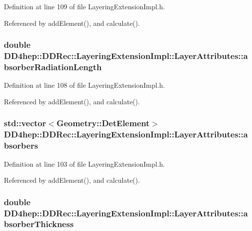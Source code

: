 Definition at line 109 of file LayeringExtensionImpl.h.

Referenced by addElement(), and calculate().\hypertarget{struct_d_d4hep_1_1_d_d_rec_1_1_layering_extension_impl_1_1_layer_attributes_ab8e487c7c57cf4ad23dc81eb85189d96}{
\subsubsection[{absorberRadiationLength}]{\setlength{\rightskip}{0pt plus 5cm}double {\bf DD4hep::DDRec::LayeringExtensionImpl::LayerAttributes::absorberRadiationLength}}}
\label{struct_d_d4hep_1_1_d_d_rec_1_1_layering_extension_impl_1_1_layer_attributes_ab8e487c7c57cf4ad23dc81eb85189d96}


Definition at line 108 of file LayeringExtensionImpl.h.

Referenced by addElement(), and calculate().\hypertarget{struct_d_d4hep_1_1_d_d_rec_1_1_layering_extension_impl_1_1_layer_attributes_a36c95a802bff564fab44f6c0cfdfbda3}{
\subsubsection[{absorbers}]{\setlength{\rightskip}{0pt plus 5cm}std::vector$<${\bf Geometry::DetElement}$>$ {\bf DD4hep::DDRec::LayeringExtensionImpl::LayerAttributes::absorbers}}}
\label{struct_d_d4hep_1_1_d_d_rec_1_1_layering_extension_impl_1_1_layer_attributes_a36c95a802bff564fab44f6c0cfdfbda3}


Definition at line 103 of file LayeringExtensionImpl.h.

Referenced by addElement(), and calculate().\hypertarget{struct_d_d4hep_1_1_d_d_rec_1_1_layering_extension_impl_1_1_layer_attributes_a82e4964fda149e1cf07f18048b13ac64}{
\subsubsection[{absorberThickness}]{\setlength{\rightskip}{0pt plus 5cm}double {\bf DD4hep::DDRec::LayeringExtensionImpl::LayerAttributes::absorberThickness}}}
\label{struct_d_d4hep_1_1_d_d_rec_1_1_layering_extension_impl_1_1_layer_attributes_a82e4964fda149e1cf07f18048b13ac64}


